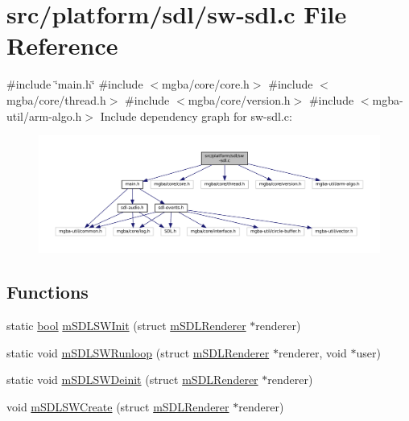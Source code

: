 \hypertarget{sw-sdl_8c}{}\section{src/platform/sdl/sw-\/sdl.c File Reference}
\label{sw-sdl_8c}
{\ttfamily \#include \char`\"{}main.\+h\char`\"{}}\newline
{\ttfamily \#include $<$mgba/core/core.\+h$>$}\newline
{\ttfamily \#include $<$mgba/core/thread.\+h$>$}\newline
{\ttfamily \#include $<$mgba/core/version.\+h$>$}\newline
{\ttfamily \#include $<$mgba-\/util/arm-\/algo.\+h$>$}\newline
Include dependency graph for sw-\/sdl.c\+:
\nopagebreak
\begin{figure}[H]
\begin{center}
\leavevmode
\includegraphics[width=350pt]{sw-sdl_8c__incl}
\end{center}
\end{figure}
\subsection*{Functions}
\begin{DoxyCompactItemize}
\item 
static \mbox{\hyperlink{libretro_8h_a4a26dcae73fb7e1528214a068aca317e}{bool}} \mbox{\hyperlink{sw-sdl_8c_aac002ada1b387a89102bceb5e2b2b9b9}{m\+S\+D\+L\+S\+W\+Init}} (struct \mbox{\hyperlink{structm_s_d_l_renderer}{m\+S\+D\+L\+Renderer}} $\ast$renderer)
\item 
static void \mbox{\hyperlink{sw-sdl_8c_a96edfd01d5672d6808d8d91f3053d79d}{m\+S\+D\+L\+S\+W\+Runloop}} (struct \mbox{\hyperlink{structm_s_d_l_renderer}{m\+S\+D\+L\+Renderer}} $\ast$renderer, void $\ast$user)
\item 
static void \mbox{\hyperlink{sw-sdl_8c_a7ecb29d26edf8f1b3dfbec39f86d0310}{m\+S\+D\+L\+S\+W\+Deinit}} (struct \mbox{\hyperlink{structm_s_d_l_renderer}{m\+S\+D\+L\+Renderer}} $\ast$renderer)
\item 
void \mbox{\hyperlink{sw-sdl_8c_a944f8c2784dcc50f705cd99f98609ee4}{m\+S\+D\+L\+S\+W\+Create}} (struct \mbox{\hyperlink{structm_s_d_l_renderer}{m\+S\+D\+L\+Renderer}} $\ast$renderer)
\end{DoxyCompactItemize}


